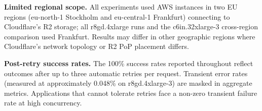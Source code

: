 \textbf{Limited regional scope.} All experiments used AWS instances in two EU regions (eu-north-1 Stockholm and eu-central-1 Frankfurt) connecting to Cloudflare's R2 storage; all r8gd.4xlarge runs and the c6in.32xlarge-3 cross-region comparison used Frankfurt. Results may differ in other geographic regions where Cloudflare's network topology or R2 PoP placement differs.

\textbf{Post-retry success rates.} The 100\% success rates reported throughout reflect outcomes after up to three automatic retries per request. Transient error rates (measured at approximately 0.048\% on r8gd.4xlarge-3) are masked in aggregate metrics. Applications that cannot tolerate retries face a non-zero transient failure rate at high concurrency.
